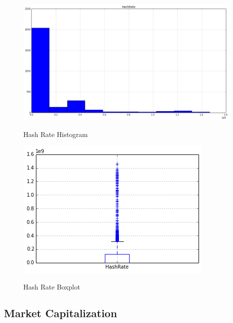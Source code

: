 \begin{figure}[bth]
  \myfloatalign
  {\includegraphics[width=1\linewidth]
    {gfx/hash-rate-histogram}}
  \caption{Hash Rate Histogram}
  \label{fig:hash-rate-histogram}
\end{figure}

\begin{figure}[bth]
  \myfloatalign
  {\includegraphics[width=1\linewidth]
    {gfx/hash-rate-boxplot}}
  \caption{Hash Rate Boxplot}
  \label{fig:hash-rate-boxplot}
\end{figure}

\clearpage

\subsection{Market Capitalization}
\label{sec:market-cap}

